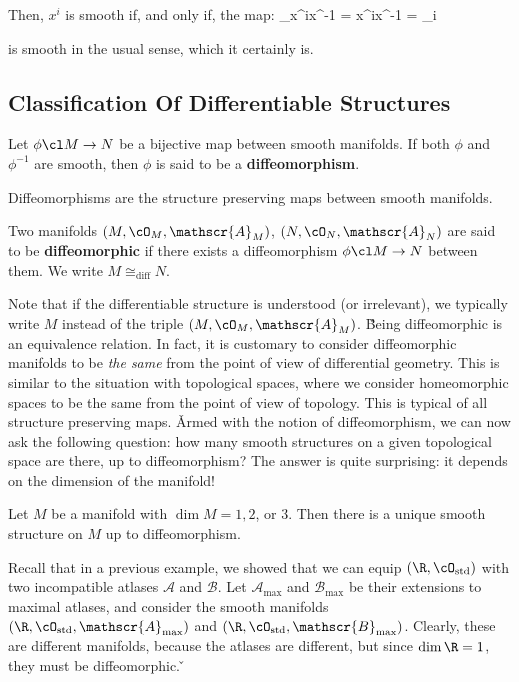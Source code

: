 \vspace{12pt}

Then, $x^i$ is smooth if, and only if, the map:
\bse
{\id_\R}\circ x^i\circ x^{-1} = x^i\circ x^{-1} = \proj_i
\ese

is smooth in the usual sense, which it certainly is.
\ee

\subsection{Classification Of Differentiable Structures}

\bd [Diffeomorphism]
Let $\phi\cl M \to N$ be a bijective map between smooth manifolds. If both $\phi$ and $\phi^{-1}$ are smooth, then
$\phi$ is said to be a \textbf{diffeomorphism}.
\ed

Diffeomorphisms are the structure preserving maps between smooth manifolds.

Two manifolds $(M,\cO_M,\mathscr{A}_M)$, $(N,\cO_N,\mathscr{A}_N)$ are said to be \textbf{diffeomorphic} if there
exists a diffeomorphism $\phi\cl M\to N$ between them. We write $M \cong_\text{diff}N$.
\ed

Note that if the differentiable structure is understood (or irrelevant), we typically write $M$ instead of the triple
$(M,\cO_M,\mathscr{A}_M)$. \v

Being diffeomorphic is an equivalence relation. In fact, it is customary to consider diffeomorphic manifolds to be
\emph{the same} from the point of view of differential geometry. This is similar to the situation with topological
spaces, where we consider homeomorphic spaces to be the same from the point of view of topology. This is typical of
all structure preserving maps. \v

Armed with the notion of diffeomorphism, we can now ask the following question: how many smooth structures on a given
topological space are there, up to diffeomorphism? The answer is quite surprising: it depends on the dimension of the
manifold!

Let $M$ be a manifold with $\dim M = 1, 2$, or $3$. Then there is a unique smooth structure on $M$ up to diffeomorphism.
\et

Recall that in a previous example, we showed that we can equip $(\R,\cO_\mathrm{std})$ with two incompatible atlases
$\mathscr{A}$ and $\mathscr{B}$. Let $\mathscr{A}_\mathrm{\max}$ and $\mathscr{B}_\mathrm{\max}$ be their extensions to
maximal atlases, and consider the smooth manifolds $(\R,\cO_\mathrm{std},\mathscr{A}_\mathrm{\max})$ and $(\R,
\cO_\mathrm{std},\mathscr{B}_\mathrm{\max})$. Clearly, these are different manifolds, because the atlases are
different, but since $\dim \R=1$, they must be diffeomorphic. \v

